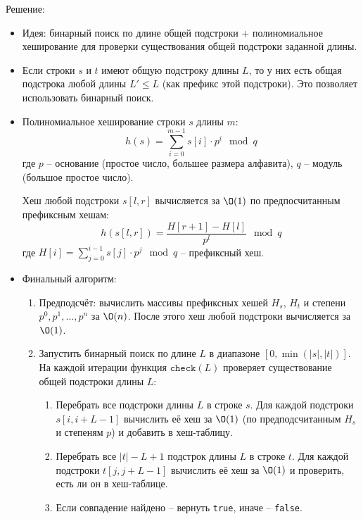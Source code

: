 \begin{enumerate}
    Решение:

    \begin{itemize}
      \item Идея: бинарный поиск по длине общей подстроки + полиномиальное хеширование 
      для проверки существования общей подстроки заданной длины.

      \item Если строки $s$ и $t$ имеют общую подстроку длины $L$, 
      то у них есть общая подстрока любой длины $L' \leq L$
      (как префикс этой подстроки). Это позволяет использовать бинарный поиск.

      \item Полиномиальное хеширование строки $s$ длины $m$:
      $$h(s) = \sum_{i=0}^{m-1} s[i] \cdot p^i \mod q$$
      где $p$ -- основание (простое число, большее размера алфавита), $q$ -- модуль (большое простое число).

      Хеш любой подстроки $s[l, r]$ вычисляется за $\O(1)$ по предпосчитанным префиксным хешам:
      $$h(s[l, r]) = \frac{H[r+1] - H[l]}{p^l} \mod q$$
      где $H[i] = \sum_{j=0}^{i-1} s[j] \cdot p^j \mod q$ -- префиксный хеш.

      \item Финальный алгоритм:
      \begin{enumerate}
        \item Предподсчёт: вычислить массивы префиксных хешей $H_s$, $H_t$
        и степени $p^0, p^1, \ldots, p^n$ за $\O(n)$.
        После этого хеш любой подстроки вычисляется за $\O(1)$.

        \item Запустить бинарный поиск по длине $L$ в диапазоне $[0, \min(|s|, |t|)]$.
        На каждой итерации функция $\texttt{check}(L)$ проверяет существование общей подстроки длины $L$:

        \begin{enumerate}
          \item Перебрать все подстроки длины $L$ в строке $s$.
          Для каждой подстроки $s[i, i+L-1]$ вычислить её хеш за $\O(1)$
          (по предподсчитанным $H_s$ и степеням $p$) и добавить в хеш-таблицу.

          \item Перебрать все $|t| - L + 1$ подстрок длины $L$ в строке $t$.
          Для каждой подстроки $t[j, j+L-1]$ вычислить её хеш за $\O(1)$ и проверить, есть ли он в хеш-таблице.

          \item Если совпадение найдено -- вернуть \texttt{true}, иначе -- \texttt{false}.
        \end{enumerate}


\end{enumerate}
\end{itemize}
\end{enumerate}

